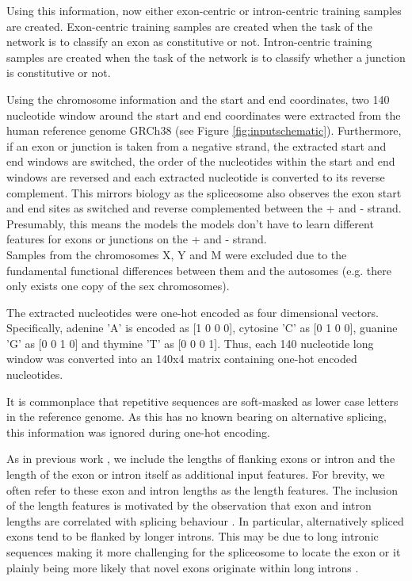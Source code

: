 Using this information, now either exon-centric or intron-centric training samples are created. Exon-centric training samples are created when the task of the network is to classify an exon as constitutive or not. Intron-centric training samples are created when the task of the network is to classify whether a junction is constitutive or not.


Using the chromosome information and the start and end coordinates, two 140 nucleotide window around the start and end coordinates were extracted from the human reference genome GRCh38 (see Figure \ref{fig:inputschematic}). Furthermore, if an exon or junction is taken from a negative strand, the extracted start and end windows are switched, the order of the nucleotides within the start and end windows are reversed and each extracted nucleotide is converted to its reverse complement. This mirrors biology as the spliceosome also observes the exon start and end sites as switched and reverse complemented between the + and - strand. Presumably, this means the models the models don't have to learn different features for exons or junctions on the + and - strand. \\
Samples from the chromosomes X, Y and M were excluded due to the fundamental functional differences between them and the autosomes (e.g. there only exists one copy of the sex chromosomes).

The extracted nucleotides were one-hot encoded as four dimensional vectors. Specifically, adenine 'A' is encoded as [1 0 0 0], cytosine 'C' as [0 1 0 0], guanine 'G' as [0 0 1 0] and thymine 'T' as [0 0 0 1]. Thus, each 140 nucleotide long window was converted into an 140x4 matrix containing one-hot encoded nucleotides.

It is commonplace that repetitive sequences are soft-masked as lower case letters in the reference genome. As this has no known bearing on alternative splicing, this information was ignored during one-hot encoding.

As in previous work \cite{dsc} \cite{flawed4}, we include the lengths of flanking exons or intron and the length of the exon or intron itself as additional input features. For brevity, we often refer to these exon and intron lengths as the length features. The inclusion of the length features is motivated by the observation that exon and intron lengths are correlated with splicing behaviour \cite{lengthsref1} \cite{lengthsref2}. In particular, alternatively spliced exons tend to be flanked by longer introns. This may be due to long intronic sequences making it more challenging for the spliceosome to locate the exon or it plainly being more likely that novel exons originate within long introns \cite{bestlengthsref}. 


